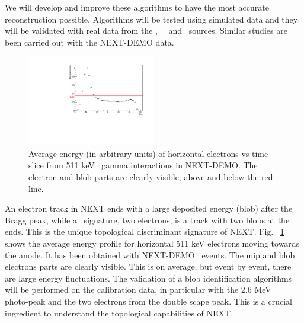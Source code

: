 We will develop and improve these algorithms to
 have the most accurate reconstruction possible.
Algorithms will be tested using simulated data
and they will be validated with real data from the \NA,  ~\CS ~and \Tl ~sources. Similar studies are been carried out with the NEXT-DEMO data.

\begin{figure}
\begin{center}
\includegraphics[width=0.5\textwidth]{img/CALREC_Eslice_DEMO.pdf}
\caption{\small Average energy (in arbitrary units) of horizontal electrons vs time slice from 511 keV \NA ~gamma interactions in NEXT-DEMO. The electron and blob parts are clearly visible, above and below the red line.}
\label{fig:CALREC_E}
\end{center}
\end{figure}

An electron track in NEXT ends with a large deposited energy (blob) after the Bragg peak, while a \bb ~signature, two electrons, is a track with two blobs at the ends.
This is the unique topological discriminant signature of NEXT.
Fig.  ~\ref{fig:CALREC_E} shows the average energy profile for horizontal 511 keV electrons moving towards the anode. It has been obtained with NEXT-DEMO \NA ~events. The mip and blob electrons parts are clearly visible. This is on average, but event by event, there are large energy fluctuations. 
The validation of a blob identification algorithms will be performed on the calibration data, in particular with the 2.6 MeV \Tl~ photo-peak and the two electrons from the double scape peak. This is a crucial ingredient to understand the topological capabilities of NEXT.

